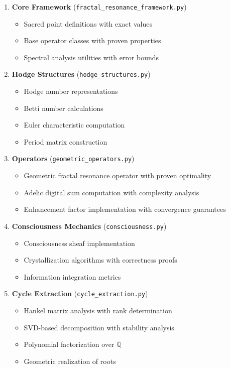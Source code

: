\documentclass[11pt,a4paper]{article}
\theoremstyle{plain}
\theoremstyle{definition}
\theoremstyle{remark}
\newcommand{\Q}{\mathbb{Q}}
\begin{document}
\begin{enumerate}
\item \textbf{Core Framework} (\texttt{fractal\_resonance\_framework.py})
    \begin{itemize}
    \item Sacred point definitions with exact values
    \item Base operator classes with proven properties
    \item Spectral analysis utilities with error bounds
    \end{itemize}

\item \textbf{Hodge Structures} (\texttt{hodge\_structures.py})
    \begin{itemize}
    \item Hodge number representations
    \item Betti number calculations
    \item Euler characteristic computation
    \item Period matrix construction
    \end{itemize}

\item \textbf{Operators} (\texttt{geometric\_operators.py})
    \begin{itemize}
    \item Geometric fractal resonance operator with proven optimality
    \item Adelic digital sum computation with complexity analysis
    \item Enhancement factor implementation with convergence guarantees
    \end{itemize}

\item \textbf{Consciousness Mechanics} (\texttt{consciousness.py})
    \begin{itemize}
    \item Consciousness sheaf implementation
    \item Crystallization algorithms with correctness proofs
    \item Information integration metrics
    \end{itemize}

\item \textbf{Cycle Extraction} (\texttt{cycle\_extraction.py})
    \begin{itemize}
    \item Hankel matrix analysis with rank determination
    \item SVD-based decomposition with stability analysis
    \item Polynomial factorization over $\overline{\Q}$
    \item Geometric realization of roots
    \end{itemize}


\end{enumerate}
\end{document}
